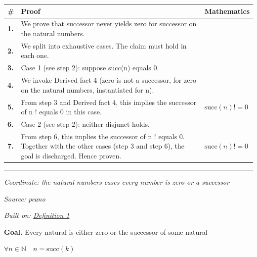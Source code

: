 \documentclass[11pt]{article}
\theoremstyle{definition}
\begin{document}
\begin{tabular}{@{} >{\raggedright\arraybackslash}p{} >{\raggedright\arraybackslash}p{} >{\raggedleft\arraybackslash}p{} @{}}
\textbf{\#} & \textbf{Proof} & \textbf{Mathematics} \\
\midrule
\textbf{1.} & We prove that successor never yields zero for successor on the natural numbers. & \\[0.45em]
\textbf{2.} & We split into exhaustive cases. The claim must hold in each one. & \\[0.45em]
\textbf{3.} & Case 1 (see step 2): suppose succ(n)  equals  0. & \\[0.45em]
\textbf{4.} & We invoke Derived fact 4 (zero is not a successor, for zero on the natural numbers, instantiated for n). & \\[0.45em]
\textbf{5.} & From step 3 and Derived fact 4, this implies the successor of n ! equals 0 in this case. & $\displaystyle \mathrm{succ}(n) != 0$ \\[0.45em]
\textbf{6.} & Case 2 (see step 2): neither disjunct holds. & \\[0.45em]
\textbf{7.} & From step 6, this implies the successor of n ! equals 0. Together with the other cases (step 3 and step 6), the goal is discharged. Hence proven. & $\displaystyle \mathrm{succ}(n) != 0$ \\[0.45em]
\bottomrule
\end{tabular}
\label{thm:Nat-successor-successor_never_yields_zero}
\par\medskip\hrule
\bigskip
{}\par
\smallskip\noindent\textit{Coordinate: the natural numbers \cdot cases \cdot every number is zero or a successor}\par
\smallskip\noindent\textit{Source: peano}\par
\smallskip\noindent\textit{Built on: \hyperref[thm:Nat-predecessor-predecessor_undoes_successor]{Definition 1}}\par
\medskip
\noindent\textbf{Goal.} Every natural is either zero or the successor of some natural\par
\noindent$\displaystyle \forall n \in \mathbb{N}\quad n = \mathrm{succ}(k)$\par
\medskip
\noindent
\end{document}
